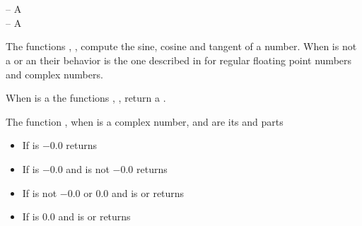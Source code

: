 \documentclass[../Exponentials-Logarithms-Trigonometry.tex]{subfiles}
\begin{document}

\DSyntax{}

  \RArrow {}\\
  \RArrow {}\\
  \RArrow {}

\DArgsNValues{}

 -- A \\
 -- A 

\DDescription{}

The functions , ,  compute the sine, cosine
and tangent of a number. When  is not a  or an
 their behavior is the one described in
\cite{1996:ANSIHyperSpec} for regular floating point numbers and complex
numbers.

\noindent
When  is a  the functions ,
,  return a .

\noindent
The function , when  is a complex number, 
and  are its  and  parts
\begin{itemize}
  \item If  is $-0.0$ returns 
  \item If  is $-0.0$ and  is not
$-0.0$ returns \code{))))}
  \item If  is not $-0.0$ or $0.0$ and
   is  or  returns
   \code{)} \code{))}
  \item If  is $0.0$ and  is
   or  returns \code{)}
\end{itemize}
\end{document}
